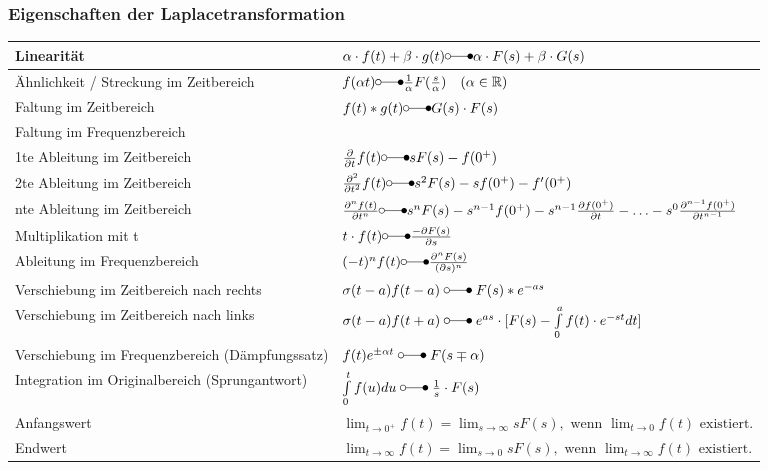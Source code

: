 \subsubsection{Eigenschaften der Laplacetransformation}
\renewcommand{\arraystretch}{1.5}
\begin{tabular}{|l|l|}
	\hline Linearität	& $\alpha\cdot f(t) + \beta\cdot g(t) \laplace \alpha\cdot F(s) + \beta\cdot G(s)$\\
	\hline Ähnlichkeit / Streckung im Zeitbereich & $f(\alpha t) \laplace \frac{1}{\alpha}F(\frac{s}{\alpha})\quad (\alpha \in \mathbb{R})$\\
	\hline Faltung im Zeitbereich & $f(t) * g(t) \laplace G(s) \cdot F(s)$\\
	\hline Faltung im Frequenzbereich & \\
	\hline 1te Ableitung im Zeitbereich & $\frac{\partial}{\partial t}f(t) \laplace sF(s) - f(0^{+})$\\
	\hline 2te Ableitung im Zeitbereich & $\frac{\partial^{2}}{\partial t^{2}}f(t) \laplace s^{2}F(s) - sf(0^{+}) - f'(0^{+})$\\
	\hline nte Ableitung im Zeitbereich & $\frac{\partial^{n}f(t)}{\partial t^{n}} \laplace s^{n}F(s) - s^{n-1}f(0^{+}) - s^{n-1}\frac{\partial f(0^{+})}{\partial t}- \ldots - s^{0}\frac{\partial^{n-1}f(0^{+})}{\partial t^{n-1}}$\\
	\hline Multiplikation mit t & $t \cdot f(t) \laplace \frac{-\partial F(s)}{\partial s}$\\
	\hline Ableitung im Frequenzbereich & $(-t)^{n} f(t) \laplace \frac{\partial^{n} F(s)}{(\partial s)^{n}}$\\
	\hline Verschiebung im Zeitbereich nach rechts & $\sigma(t-a)f(t - a) \; \laplace \; F(s)*e^{-as}$ \\
	\hline Verschiebung im Zeitbereich nach links & $\sigma(t-a)f(t + a) \; \laplace \; e^{as} \cdot [F(s) - \int\limits_0^{a} f(t) \cdot e^{-st} dt]$\\
	\hline Verschiebung im Frequenzbereich (Dämpfungssatz) & $f(t)e^{\pm\alpha t} \; \laplace \; F(s\mp\alpha)$ \\
	\hline Integration im Originalbereich (Sprungantwort)& $\int\limits_0^t f(u)du \; \laplace \; \frac{1}{s}\cdot F(s)$ \\
	\hline Anfangswert & $\lim_{t\rightarrow 0^+} f(t) = \lim_{s\rightarrow \infty} sF(s),\text{~wenn
	}  \lim_{t\rightarrow 0} f(t)\text{~existiert}.$ \\
	\hline Endwert & $\lim_{t\rightarrow \infty} f(t) = \lim_{s\rightarrow 0} sF(s),\text{~wenn
	}  \lim_{t\rightarrow \infty} f(t)\text{~existiert}.$ \\
	\hline
\end{tabular}
\renewcommand{\arraystretch}{1}
